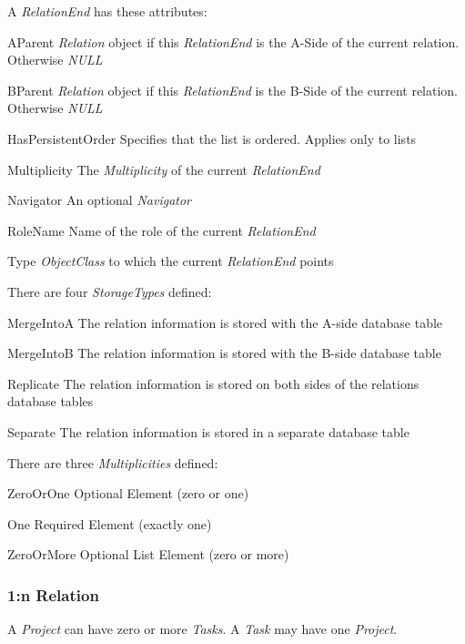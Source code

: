 A \emph{RelationEnd} has these attributes:
\begin{descriptionBorder}
	\item[AParent] { \emph{Relation} object if this \emph{RelationEnd} is the A-Side of the current relation. Otherwise \emph{NULL} }
	\item[BParent] { \emph{Relation} object if this \emph{RelationEnd} is the B-Side of the current relation. Otherwise \emph{NULL} }
	\item[HasPersistentOrder] { Specifies that the list is ordered. Applies only to lists  }
	\item[Multiplicity] { The \emph{Multiplicity} of the current \emph{RelationEnd} }
	\item[Navigator] { An optional \emph{Navigator} }
	\item[RoleName] { Name of the role of the current \emph{RelationEnd} }
	\item[Type] { \emph{ObjectClass} to which the current \emph{RelationEnd} points }
\end{descriptionBorder}

There are four \emph{StorageTypes} defined:
\begin{descriptionBorder}
	\item[MergeIntoA] { The relation information is stored with the A-side database table }
	\item[MergeIntoB] { The relation information is stored with the B-side database table }
	\item[Replicate] { The relation information is stored on both sides of the relations database tables }
	\item[Separate] { The relation information is stored in a separate database table }
\end{descriptionBorder}

There are three \emph{Multiplicities} defined:
\begin{descriptionBorder}
	\item[ZeroOrOne] { Optional Element (zero or one) }
	\item[One] { Required Element (exactly one) }
	\item[ZeroOrMore] { Optional List Element (zero or more) }
\end{descriptionBorder}

\subsubsection{1:n Relation}
A \emph{Project} can have zero or more \emph{Tasks}. A \emph{Task} may have one \emph{Project}.

